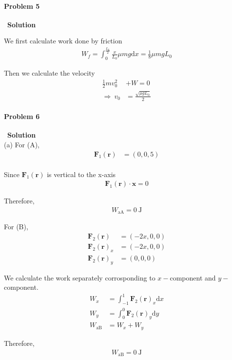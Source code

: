 \documentclass[12pt,a4paper]{article}
\begin{document}
\paragraph{\large \textbf{Problem 5}}~{\textbf{Solution}}
\vspace{2mm}
\par We first calculate work done by friction
\begin{align}
	W_f = \int_0^\frac{L_0}{2} \frac{x}{L_0}\mu mg \text{d}x = \frac{1}{8}\mu mgL_0
\end{align}
\par Then we calculate the velocity
\begin{align}
	\frac{1}{2}mv_0^2 &+ W = 0\\
\Rightarrow\ v_0 &= \frac{\sqrt{\mu gL_0}}{2}
\end{align}

\paragraph{\large \textbf{Problem 6}}~{\textbf{Solution}}
\vspace{2mm}\\
\noindent (a) For (A), 
\begin{align*}
	\textbf{F}_1 (\textbf{r}) &= (0,0,5)\\ 
\end{align*}
\par Since $\textbf{F}_1 (\textbf{r})$ is vertical to the x-axis
\begin{align*}
	\textbf{F}_1 (\textbf{r}) \cdot \textbf{x} = 0
\end{align*}
\par Therefore,
\begin{align}
	W_{\text{aA}} = 0\ \text{J}
\end{align}
\par For (B),
\begin{align*}
	\textbf{F}_2 (\textbf{r}) &= (-2x,0,0)\\ 
	\textbf{F}_2 (\textbf{r})_x &= (-2x,0,0)\\
	\textbf{F}_2 (\textbf{r})_y &= (0,0,0)
\end{align*}
\par We calculate the work separately corrosponding to $x-$component and $y-$component.
\begin{align}
	W_x &= \int_{-1}^{1} \textbf{F}_2 (\textbf{r})_x \text{d}x\\
	W_y &= \int_0^0 \textbf{F}_2 (\textbf{r})_y \text{d}y\\
	W_{\text{aB}} &= W_x + W_y
\end{align}
\par Therefore,
\begin{align}
	W_{\text{aB}} = 0\ \text{J}
\end{align}
\end{document}
